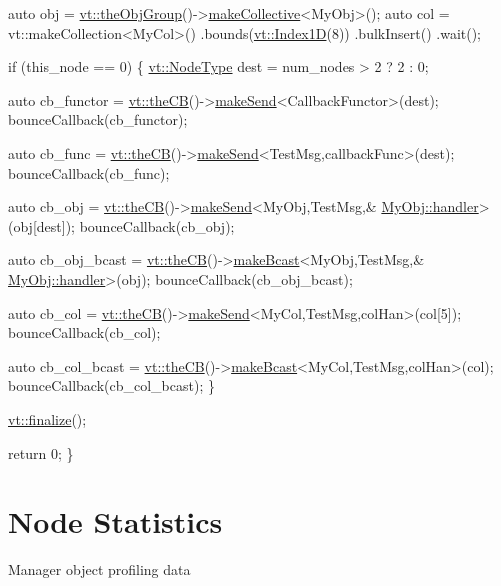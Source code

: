 \begin{DoxyCodeInclude}
  \textcolor{keyword}{auto} obj = \hyperlink{namespacevt_a833f0115b692f578167cbd88e30d39c5}{vt::theObjGroup}()->\hyperlink{structvt_1_1objgroup_1_1_obj_group_manager_a651c44a47c6bcdc9f1b6c9e857fa03f2}{makeCollective}<MyObj>();
  \textcolor{keyword}{auto} col = vt::makeCollection<MyCol>()
    .bounds(\hyperlink{structvt_1_1index_1_1_dense_index_array}{vt::Index1D}(8))
    .bulkInsert()
    .wait();

  \textcolor{keywordflow}{if} (this\_node == 0) \{
    \hyperlink{namespacevt_a866da9d0efc19c0a1ce79e9e492f47e2}{vt::NodeType} dest = num\_nodes > 2 ? 2 : 0;

    \textcolor{keyword}{auto} cb\_functor = \hyperlink{namespacevt_a673b109e94c7bca58313504c83e1da94}{vt::theCB}()->\hyperlink{structvt_1_1pipe_1_1_pipe_manager_a73583be6260418b13ee66e56cdade2da}{makeSend}<CallbackFunctor>(dest);
    bounceCallback(cb\_functor);

    \textcolor{keyword}{auto} cb\_func = \hyperlink{namespacevt_a673b109e94c7bca58313504c83e1da94}{vt::theCB}()->\hyperlink{structvt_1_1pipe_1_1_pipe_manager_a73583be6260418b13ee66e56cdade2da}{makeSend}<TestMsg,callbackFunc>(dest);
    bounceCallback(cb\_func);

    \textcolor{keyword}{auto} cb\_obj = \hyperlink{namespacevt_a673b109e94c7bca58313504c83e1da94}{vt::theCB}()->\hyperlink{structvt_1_1pipe_1_1_pipe_manager_a73583be6260418b13ee66e56cdade2da}{makeSend}<MyObj,TestMsg,&
      \hyperlink{namespacevt_1_1config_a6bd1d6215bda0d8ca02811798399f689a82a0081a94d5c5dfd18b0b3f7eca64b7}{MyObj::handler}>(obj[dest]);
    bounceCallback(cb\_obj);

    \textcolor{keyword}{auto} cb\_obj\_bcast = \hyperlink{namespacevt_a673b109e94c7bca58313504c83e1da94}{vt::theCB}()->\hyperlink{structvt_1_1pipe_1_1_pipe_manager_a2ea6bd5ea3e001662681b1e5a1971e9d}{makeBcast}<MyObj,TestMsg,&
      \hyperlink{namespacevt_1_1config_a6bd1d6215bda0d8ca02811798399f689a82a0081a94d5c5dfd18b0b3f7eca64b7}{MyObj::handler}>(obj);
    bounceCallback(cb\_obj\_bcast);

    \textcolor{keyword}{auto} cb\_col = \hyperlink{namespacevt_a673b109e94c7bca58313504c83e1da94}{vt::theCB}()->\hyperlink{structvt_1_1pipe_1_1_pipe_manager_a73583be6260418b13ee66e56cdade2da}{makeSend}<MyCol,TestMsg,colHan>(col[5]);
    bounceCallback(cb\_col);

    \textcolor{keyword}{auto} cb\_col\_bcast = \hyperlink{namespacevt_a673b109e94c7bca58313504c83e1da94}{vt::theCB}()->\hyperlink{structvt_1_1pipe_1_1_pipe_manager_a2ea6bd5ea3e001662681b1e5a1971e9d}{makeBcast}<MyCol,TestMsg,colHan>(col);
    bounceCallback(cb\_col\_bcast);
  \}

  \hyperlink{namespacevt_a540d90dbd6e97b69f1dcbc9ee9314cff}{vt::finalize}();

  \textcolor{keywordflow}{return} 0;
\}
\end{DoxyCodeInclude}
\hypertarget{node-stats}{}\section{Node Statistics}\label{node-stats}
Manager object profiling data

